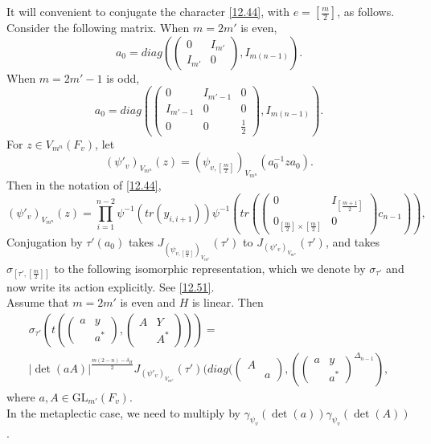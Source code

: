 \documentclass[12pts]{amsart}
\newcommand{\GL}{{\mathrm{GL}}}
\newcommand{\I}{{\mathrm{I}}}
\begin{document}
It will convenient to conjugate the character \eqref{12.44}, with $e=[\frac{m}{2}]$, as follows. Consider the following matrix. When $m=2m'$ is even,
$$
a_0=diag(\begin{pmatrix}0&I_{m'}\\I_{m'}&0\end{pmatrix},I_{m(n-1)}).
$$
When $m=2m'-1$ is odd,
$$
a_0=diag(\begin{pmatrix}0&I_{m'-1}&0\\I_{m'-1}&0&0\\0&0&\frac{1}{2}\end{pmatrix},I_{m(n-1)}).
$$
For $z\in V_{m^n}(F_v)$, let
$$
(\psi'_v)_{V_{m^n}}(z)=(\psi_{v,[\frac{m}{2}]})_{V_{m^n}}(a_0^{-1}za_0).
$$
Then in the notation of \eqref{12.44},
\begin{equation}\label{12.52.1}
(\psi'_v)_{V_{m^n}}(z)
=\prod_{i=1}^{n-2}\psi^{-1}(tr(y_{i,i+1}))\psi^{-1}(tr(\begin{pmatrix}0&I_{[\frac{m+1}{2}]}\\0_{[\frac{m}{2}]\times [\frac{m}{2}]}&0\end{pmatrix}c_{n-1})),
\end{equation}
Conjugation by $\tau'(a_0)$ takes $J_{(\psi_{v,[\frac{m}{2}]})_{V_{m^n}}}(\tau')$
to $J_{(\psi'_v)_{V_{m^n}}}(\tau')$, and takes $\sigma_{[\tau',[\frac{m}{2}]]}$ to the following isomorphic representation, which we denote by $\sigma_{\tau'}$ and now write its action explicitly. See \eqref{12.51}.\\
Assume that $m=2m'$ is even and $H$ is linear. Then
\begin{multline}\label{12.53}
\sigma_{\tau'}(t(\begin{pmatrix}a&y\\&a^*\end{pmatrix}, \begin{pmatrix}A&Y\\&A^*\end{pmatrix}))=\\
|\det(aA)|^{\frac{m(2-n)-\delta_H}{2}} J_{(\psi'_v)_{V_{m^n}}}(\tau')(diag( \begin{pmatrix}A\\&a\end{pmatrix}, (\begin{pmatrix}a&y\\&a^*\end{pmatrix}^{\Delta_{n-1}}),
\end{multline}
where $a, A\in \GL_{m'}(F_v)$.\\
In the metaplectic case, we need to multiply by $\gamma_{\psi_v}(\det(a))\gamma_{\psi_v}(\det(A))$.\\
\end{document}

